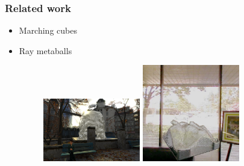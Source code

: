 \documentclass{beamer}
\begin{document}
	\begin{frame}[t]\frametitle{Related work}
		\begin{itemize}

			\item Marching cubes %
			\item Ray metaballs  %
			\begin{center}
				\begin{figure}
					\includegraphics[width=0.4\textwidth]{marching_cubes.png}\hspace{1em}
					\includegraphics[width=0.4\textwidth]{metaball.png}
				\end{figure}
			\end{center}
		\end{itemize}
	\end{frame}
\end{document}
